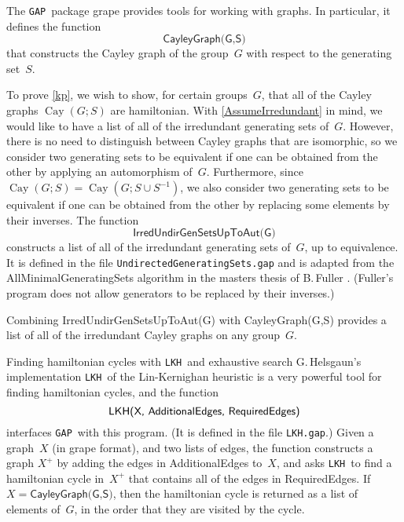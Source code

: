 \documentclass[]{amcjoucc}
\makeatletter
\theoremstyle{plain}
\theoremstyle{definition}
\theoremstyle{definition}
\DeclareMathOperator{\Cay}{Cay}
\newcommand{\GAP}{\filename{GAP}}
\newcommand{\LKH}{\filename{LKH}}
\newcommand{\filename}[1]{\texttt{#1}}
\newcommand{\function}[1]{\textsf{#1}}
\renewcommand{\subsection}{%
\@startsection{subsection}{2}{0pt}{-\baselineskip}{0.5\baselineskip}{\mathversion{bold}\bfseries}%
}
\makeatother
\begin{document}
The \GAP\ package \textsf{grape} provides tools for working with graphs. In particular, it defines the function
	$$ \function{CayleyGraph(G,S)} $$
that constructs the Cayley graph of the group~$G$ with respect to the generating set~$S$.

To prove \cref{kp}, we wish to show, for certain groups~$G$, that all of the Cayley graphs $\Cay(G;S)$ are hamiltonian. With \cref{AssumeIrredundant} in mind, we would like to have a list of all of the irredundant generating sets of~$G$. However, there is no need to distinguish between Cayley graphs that are isomorphic, so we consider two generating sets to be equivalent if one can be obtained from the other by applying an automorphism of~$G$. Furthermore, since $\Cay(G;S) = \Cay(G;S \cup S^{-1})$, we also consider two generating sets to be equivalent if one can be obtained from the other by replacing some elements by their inverses. The function
	$$ \function{IrredUndirGenSetsUpToAut(G)} $$
constructs a list of all of the irredundant generating sets of~$G$, up to equivalence. It is defined in the file \filename{UndirectedGeneratingSets.gap} and is adapted from the \function{AllMinimalGeneratingSets} algorithm in the masters thesis of B.\,Fuller \cite[pp.~31--34]{Fuller-CCAThesis}. (Fuller's program does not allow generators to be replaced by their inverses.)

Combining \function{IrredUndirGenSetsUpToAut(G)} with \function{CayleyGraph(G,S)} provides a list of all of the irredundant Cayley graphs on any group~$G$.


\subsection{Finding hamiltonian cycles with \LKH\ and exhaustive search}
G.\,Helsgaun's \cite{LKH} implementation \LKH\ of the Lin-Kernighan heuristic is a very powerful tool for finding hamiltonian cycles, and the function
	$$ \text{\function{LKH(X, AdditionalEdges, RequiredEdges)}} $$
interfaces \GAP\ with this program. (It is defined in the file \filename{LKH.gap}.) Given a graph~$X$ (in \textsf{grape} format), and two lists of edges, the function constructs a graph $X^+$ by adding the edges in \function{AdditionalEdges} to~$X$, and asks \LKH\ to find a hamiltonian cycle in~$X^+$ that contains all of the edges in \function{RequiredEdges}. If $X = \function{CayleyGraph(G,S)}$, then the hamiltonian cycle is returned as a list of elements of~$G$, in the order that they are visited by the cycle.
\end{document}
